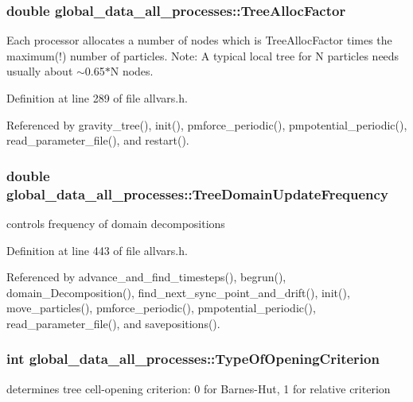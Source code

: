 \hypertarget{structglobal__data__all__processes_a374a92c40b930e388b7180b8862c3670}{
\subsubsection[{TreeAllocFactor}]{\setlength{\rightskip}{0pt plus 5cm}double {\bf global\_\-data\_\-all\_\-processes::TreeAllocFactor}}}
\label{structglobal__data__all__processes_a374a92c40b930e388b7180b8862c3670}
Each processor allocates a number of nodes which is TreeAllocFactor times the maximum(!) number of particles. Note: A typical local tree for N particles needs usually about $\sim$0.65$\ast$N nodes. 

Definition at line 289 of file allvars.h.



Referenced by gravity\_\-tree(), init(), pmforce\_\-periodic(), pmpotential\_\-periodic(), read\_\-parameter\_\-file(), and restart().

\hypertarget{structglobal__data__all__processes_a31f122fafb06e13f611ff905f514bfa9}{
\subsubsection[{TreeDomainUpdateFrequency}]{\setlength{\rightskip}{0pt plus 5cm}double {\bf global\_\-data\_\-all\_\-processes::TreeDomainUpdateFrequency}}}
\label{structglobal__data__all__processes_a31f122fafb06e13f611ff905f514bfa9}
controls frequency of domain decompositions 

Definition at line 443 of file allvars.h.



Referenced by advance\_\-and\_\-find\_\-timesteps(), begrun(), domain\_\-Decomposition(), find\_\-next\_\-sync\_\-point\_\-and\_\-drift(), init(), move\_\-particles(), pmforce\_\-periodic(), pmpotential\_\-periodic(), read\_\-parameter\_\-file(), and savepositions().

\hypertarget{structglobal__data__all__processes_a0c2a481de17eefbbd973fb8a7bb6f8fc}{
\subsubsection[{TypeOfOpeningCriterion}]{\setlength{\rightskip}{0pt plus 5cm}int {\bf global\_\-data\_\-all\_\-processes::TypeOfOpeningCriterion}}}
\label{structglobal__data__all__processes_a0c2a481de17eefbbd973fb8a7bb6f8fc}
determines tree cell-\/opening criterion: 0 for Barnes-\/Hut, 1 for relative criterion 

